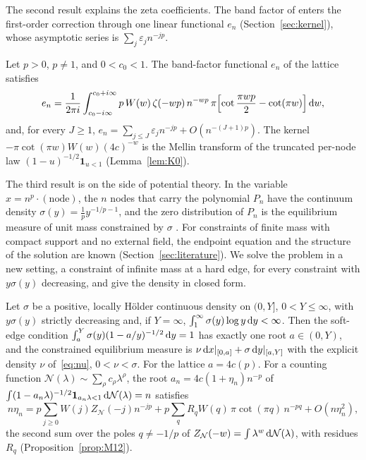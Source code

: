 The second result explains the zeta coefficients. The band factor of \cite{PaperII} enters the first-order
correction through one linear functional $e_n$ (Section~\ref{sec:kernel}), whose asymptotic series is
$\sum_j\varepsilon_jn^{-jp}$.

\begin{mainthm}\label{thm:B}
Let $p>0$, $p\ne1$, and $0<c_0<1$. The band-factor functional $e_n$ of the lattice satisfies
\[
  e_n=\frac1{2\pi i}\int_{c_0-i\infty}^{c_0+i\infty}p\,W(w)\,\zeta(-wp)\,n^{-wp}\,
  \pi\Bigl[\cot\frac{\pi wp}2-\cot(\pi w)\Bigr]\,\mathrm{d} w ,
\]
and, for every $J\ge1$, $e_n=\sum_{j\le J}\varepsilon_jn^{-jp}+O(n^{-(J+1)p})$. The kernel $-\pi\cot(\pi w)W(w)(4c)^{-w}$
is the Mellin transform of the truncated per-node law $(1-u)^{-1/2}\mathbf 1_{u<1}$ (Lemma~\ref{lem:K0}).
\end{mainthm}

The third result is on the side of potential theory. In the variable $x=n^p\cdot(\text{node})$, the $n$ nodes that
carry the polynomial $P_n$ have the continuum density $\sigma(y)=\frac1py^{-1/p-1}$, and the zero distribution of
$P_n$ is the equilibrium measure of unit mass constrained by $\sigma$ \cite{Rakhmanov,DragnevSaff,PaperI}. For constraints of finite
mass with compact support and no external field, the endpoint equation and the structure of the solution are known
\cite{BeckermannKuijlaars2001,BeckermannHelart} (Section~\ref{sec:literature}). We solve the problem in a new setting, a constraint of
infinite mass at a hard edge, for every constraint with $y\sigma(y)$ decreasing, and give the density in closed form.

\begin{mainthm}\label{thm:C}
Let $\sigma$ be a positive, locally H\"older continuous density on $(0,Y]$, $0<Y\le\infty$, with $y\sigma(y)$ strictly
decreasing and, if $Y=\infty$, $\int_1^\infty\sigma(y)\log y\,\mathrm{d} y<\infty$. Then the soft-edge condition
$\int_a^Y\sigma(y)(1-a/y)^{-1/2}\,\mathrm{d} y=1$ has exactly one root $a\in(0,Y)$, and the constrained equilibrium measure is
$\nu\,\mathrm{d} x|_{[0,a]}+\sigma\,\mathrm{d} y|_{[a,Y]}$ with the explicit density $\nu$ of~\eqref{eq:nu}, $0<\nu<\sigma$. For the
lattice $a=4c(p)$. For a counting function $\mathcal N(\lambda)\sim\sum_\rho c_\rho\lambda^\rho$, the root
$a_n=4c(1+\eta_n)n^{-p}$ of $\int(1-a_n\lambda)^{-1/2}\mathbf 1_{a_n\lambda<1}\,\mathrm{d}\mathcal N(\lambda)=n$ satisfies
\[
  n\eta_n=p\sum_{j\ge0}W(j)Z_{\mathcal N}(-j)n^{-jp}+p\sum_qR_qW(q)\,\pi\cot(\pi q)\,n^{-pq}+O(n\eta_n^2),
\]
the second sum over the poles $q\ne-1/p$ of $Z_{\mathcal N}(-w)=\int\lambda^{w}\,\mathrm{d}\mathcal N(\lambda)$, with residues
$R_q$ (Proposition~\ref{prop:M12}).
\end{mainthm}

